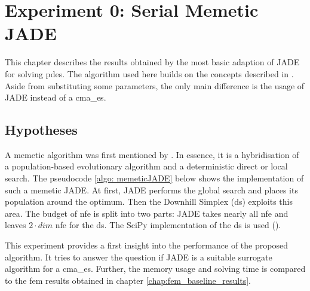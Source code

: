\documentclass[./\jobname.tex]{subfiles}
\begin{document}
\chapter {Experiment 0: Serial Memetic JADE}
\label{chap:experimet_0}

This chapter describes the results obtained by the most basic adaption of JADE for solving \gls{pde}s. The algorithm used here builds on the concepts described in \cite{chaquet_using_2019}. Aside from substituting some parameters, the only main difference is the usage of JADE instead of a \gls{cma_es}. 

\section{Hypotheses}
A memetic algorithm was first mentioned by \cite{moscato_evolution_2000}. In essence, it is a hybridisation of a population-based evolutionary algorithm and a deterministic direct or local search. The pseudocode \ref{algo: memeticJADE} below shows the implementation of such a memetic JADE. At first, JADE performs the global search and places its population around the optimum. Then the Downhill Simplex (\gls{ds}) exploits this area. The budget of \gls{nfe} is split into two parts: JADE takes nearly all \gls{nfe} and leaves $2\cdot dim$ \gls{nfe} for the \gls{ds}. The SciPy implementation of the \gls{ds} is used (\cite{scipy_scipyoptimizefmin_2020}).

\begin{algorithm}[h]
	\SetAlgoNoLine
	\DontPrintSemicolon
	\label{algo: memeticJADE}
\end{algorithm}

This experiment provides a first insight into the performance of the proposed algorithm. It tries to answer the question if JADE is a suitable surrogate algorithm for a \gls{cma_es}. Further, the memory usage and solving time is compared to the \gls{fem} results obtained in chapter \ref{chap:fem_baseline_results}. 
\end{document}
